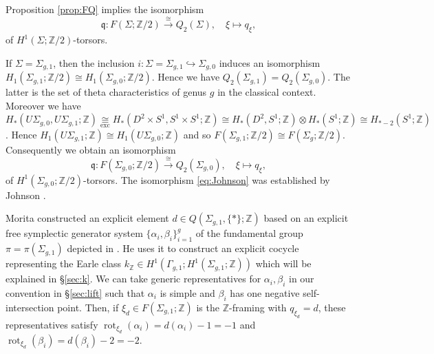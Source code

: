 \documentclass[a4paper,12pt, twoside]{amsart}
\theoremstyle{definition}
\theoremstyle{remark}
\numberwithin{equation}{section}
\newcommand\bZ{{\mathbb{Z}}}
\newcommand\rot{\operatorname{rot}}
\begin{document}
Proposition \ref{prop:FQ} implies the isomorphism 
\begin{equation}\label{eq:spinS}
\mathfrak{q}: F(\Sigma; \bZ /2) \overset\cong\to Q_2(\Sigma), \quad \xi \mapsto q_\xi,
\end{equation} 
of $H^1(\Sigma; \bZ/2)$-torsors. \par
If $\Sigma = \Sigma_{g,1}$, then the inclusion $i: \Sigma = \Sigma_{g,1} \hookrightarrow \Sigma_{g,0}$ induces an isomorphism $H_1(\Sigma_{g,1}; \bZ/2) \cong H_1(\Sigma_{g,0}; \bZ/2)$. 
Hence we have $Q_2(\Sigma_{g,1}) = Q_2(\Sigma_{g,0})$. The latter is the set of theta characteristics of genus $g$ in the classical context. 
Moreover we have $H_*(U\Sigma_{g,0}, U\Sigma_{g,1}; \bZ) \underset{\text{exc}}\cong H_*(D^2\times S^1, S^1\times S^1; \bZ) \cong H_*(D^2, S^1; \bZ) \otimes H_*(S^1; \bZ) \cong H_{*-2}(S^1; \bZ)$. 
Hence $H_1(U\Sigma_{g,1}; \bZ) \cong H_1(U\Sigma_{g,0}; \bZ)$ and so 
$F(\Sigma_{g,1}; \bZ/2) \cong F(\Sigma_{g}; \bZ/2)$. Consequently we obtain an isomorphism 
\begin{equation}\label{eq:Johnson}
\mathfrak{q}: F(\Sigma_{g,0}; \bZ/2) \overset\cong\to  Q_2(\Sigma_{g,0}), \quad \xi \mapsto q_\xi,
\end{equation}
of $H^1(\Sigma_{g,0}; \bZ/2)$-torsors. 
The isomorphism \eqref{eq:Johnson} was established by Johnson \cite[Theorem 3A, p.371]{J80a}. \par

Morita \cite[\S6, p.803]{Mo89} constructed an explicit element $d \in Q(\Sigma_{g,1}, \{\ast\}; \bZ)$ based on an explicit free symplectic generator system $\{\alpha_i, \beta_i\}^g_{i=1}$ of the fundamental group $\pi = \pi(\Sigma_{g,1})$ depicted in \cite[Figure 3, p.801]{Mo89}. 
He uses it to construct an explicit cocycle representing the Earle class $k_{\bZ} \in H^1(\Gamma_{g,1}; H^1(\Sigma_{g,1}; \bZ))$ which will be explained in \S\ref{sec:k}. 
We can take generic representatives for $\alpha_i, \beta_i$ in our convention in \S\ref{sec:lift} such that $\alpha_i$ is simple and $\beta_i$ has one negative self-intersection point. 
Then, if $\xi_d \in F(\Sigma_{g,1}; \bZ)$ is the $\bZ$-framing with $q_{\xi_d} = d$, these representatives satisfy $\rot_{\xi_d}(\alpha_i) = d(\alpha_i) - 1 = -1$ and $\rot_{\xi_d}(\beta_i) = d(\beta_i) - 2 = -2$. \par
\end{document}
